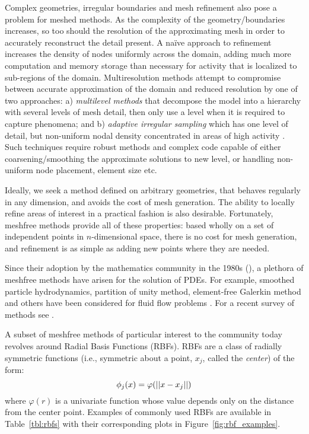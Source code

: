 Complex geometries, irregular boundaries and mesh refinement also pose a problem for meshed methods. As the complexity of 
the geometry/boundaries increases, so too should the resolution of the approximating mesh in order to 
accurately reconstruct the detail present. A na\"{i}ve approach to refinement increases the density of nodes uniformly across the 
domain, adding much more computation and memory storage than necessary for activity that is localized to sub-regions 
of the domain. Multiresolution methods attempt to compromise between accurate approximation of the domain and 
reduced resolution by one of two approaches: a) \emph{multilevel methods} that decompose the model into a hierarchy with 
several levels of mesh detail, then only use a level when it is required to capture phenomena; and b) \emph{adaptive irregular 
sampling} which has one level of detail, but non-uniform nodal density concentrated in areas of high activity \cite
{Iske:2004}. Such techniques require robust methods and complex code capable of either coarsening/smoothing the 
approximate solutions to new level, or handling non-uniform node placement, element size etc. 

Ideally, we seek a method defined on arbitrary geometries, that behaves regularly in any dimension, and avoids the cost of 
mesh generation. The ability to locally refine areas of interest in a practical fashion is also desirable. Fortunately, meshfree 
methods provide all of these properties: based wholly on a set of independent points in $n$-dimensional space, 
there is no cost for mesh generation, and refinement is as simple as adding new points where 
they are needed. 

Since their adoption by the mathematics community in the 1980s (\cite{Fasshauer:2007}), a plethora of meshfree methods have 
arisen for the solution of PDEs. For example, smoothed particle hydrodynamics, partition of unity method, element-free Galerkin 
method and others have been considered for fluid flow problems \cite{Chandhini:2007}. For a recent survey of methods see \cite{Li:2007}.


A subset of meshfree methods of particular interest to the community today revolves around Radial Basis Functions (RBFs). 
RBFs are a class of radially symmetric functions (i.e., symmetric about a point, $x_j$, called the \emph{center}) of the form: 
\begin{equation}
\phi_j(x) = \varphi(\left|\left|x - x_j\right|\right|)
\end{equation}
where $\varphi(r)$ is a univariate function whose value depends only on the distance from the center point. Examples of commonly used RBFs are available in Table~\ref{tbl:rbfs} with their corresponding plots in Figure~\ref{fig:rbf_examples}. 

